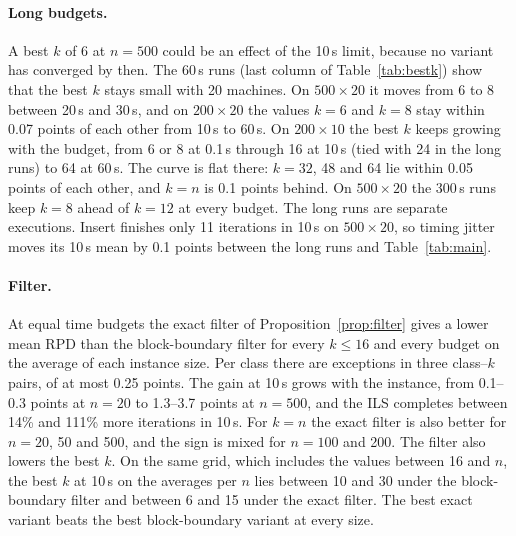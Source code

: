 \documentclass[letterpaper]{article} %
\theoremstyle{definition}
\begin{document}
\paragraph{Long budgets.} A best $k$ of 6 at $n=500$ could be an effect
of the 10\,s limit, because no variant has converged by then. The 60\,s
runs (last column of Table~\ref{tab:bestk}) show that the best $k$ stays small with 20
machines. On $500\times 20$ it moves from 6 to 8 between 20\,s and
30\,s, and on $200\times 20$ the values $k=6$ and $k=8$ stay within 0.07
points of each other from 10\,s to 60\,s. On $200\times 10$ the best
$k$ keeps growing with the budget, from 6 or 8 at 0.1\,s through 16 at
10\,s (tied with 24 in the long runs) to 64 at 60\,s. The curve is flat there: $k=32$, 48 and 64 lie within
0.05 points of each other, and $k=n$ is 0.1 points behind. On
$500\times 20$ the 300\,s runs keep $k=8$ ahead of $k=12$ at every
budget. The long runs are separate executions. Insert finishes only 11 iterations in
10\,s on $500\times 20$, so timing jitter moves its 10\,s mean by 0.1
points between the long runs and Table~\ref{tab:main}.


\paragraph{Filter.} At equal time budgets the exact filter of
Proposition~\ref{prop:filter} gives a lower mean RPD than the
block-boundary filter for every $k\leq 16$ and every budget on the
average of each instance size. Per class there are exceptions in three class--$k$ pairs, of at most 0.25 points.
The gain at 10\,s grows with the instance, from 0.1--0.3 points at $n=20$
to 1.3--3.7 points at $n=500$, and the ILS completes between 14\% and
111\% more iterations in 10\,s. For $k=n$ the exact filter is also better
for $n=20$, 50 and 500, and the sign is mixed for $n=100$ and 200. The
filter also lowers the best $k$. On the same grid, which includes the
values between 16 and $n$, the best $k$ at 10\,s on the averages per $n$
lies between 10 and 30 under the block-boundary filter and between 6 and
15 under the exact filter. The best
exact variant beats the best block-boundary variant at every size.
\end{document}
